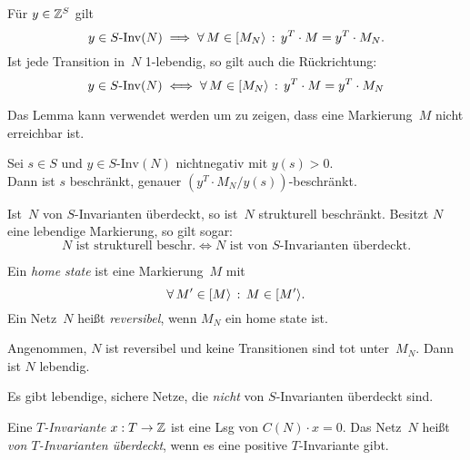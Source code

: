 \documentclass{cheat-sheet}
\newcommand{\activeTransition}[1]{[{#1}\rangle} %
\newcommand{\SInv}{S\text{-}\mathrm{Inv}} %
\begin{document}
\begin{lem}
  Für $y \in \mathbb{Z}^S$ gilt
  \[
    y \in \SInv(N) \implies \fa{M \in \activeTransition{M_N}} y^T \cdot M = y^T \cdot M_N.
  \]
  Ist jede Transition in~$N$ 1-lebendig, so gilt auch die Rückrichtung:
  \[
    y \in \SInv(N) \iff \fa{M \in \activeTransition{M_N}} y^T \cdot M = y^T \cdot M_N
  \]
\end{lem}

\begin{bem}
  Das Lemma kann verwendet werden um zu zeigen, dass eine Markierung~$M$ nicht erreichbar ist.
\end{bem}

\begin{lem}
  Sei $s \in S$ und $y \in \SInv(N)$ nichtnegativ mit $y(s) > 0$. \\
  Dann ist $s$ beschränkt, genauer $(y^T \cdot M_N / y(s))$-beschränkt.
\end{lem}

\begin{satz}
  Ist~$N$ von $S$-Invarianten überdeckt, so ist~$N$ strukturell beschränkt.
  Besitzt $N$ eine lebendige Markierung, so gilt sogar:
  \[
    \text{$N$ ist strukturell beschr.} \iff
    \text{$N$ ist von $S$-Invarianten überdeckt.}
  \]
\end{satz}

\begin{defn}
  Ein \emph{home state} ist eine Markierung~$M$ mit
  \[
    \fa{M' \in \activeTransition{M}} M \in \activeTransition{M'}.
  \]
  Ein Netz~$N$ heißt \emph{reversibel}, wenn $M_N$ ein home state ist.
\end{defn}

\begin{lem}
  Angenommen, $N$ ist reversibel und keine Transitionen sind tot unter~$M_N$.
  Dann ist $N$ lebendig.
\end{lem}

\begin{bem}
  Es gibt lebendige, sichere Netze, die \textit{nicht} von $S$-Invarianten überdeckt sind.
\end{bem}

\begin{defn}
  Eine \emph{$T$-Invariante} $x : T \to \mathbb{Z}$ ist eine Lsg von $C(N) \cdot x = 0$.
  Das Netz~$N$ heißt \emph{von $T$-Invarianten überdeckt}, wenn es eine positive $T$-Invariante gibt.
\end{defn}
\end{document}
